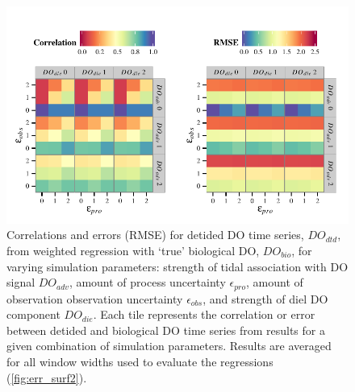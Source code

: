 \documentclass[letterpaper,12pt,oneside]{article}\usepackage[]{graphicx}\usepackage[]{color}
\makeatletter
\def\maxwidth{ %
  \ifdim\Gin@nat@width>\linewidth
    \linewidth
  \else
    \Gin@nat@width
  \fi
}
\newenvironment{knitrout}{}{} %
\makeatother
\begin{document}
\centering\vspace*{\fill}
\begin{knitrout}
\color{fgcolor}\begin{figure}[!ht]


{\centering \includegraphics[width=\maxwidth]{figure/err_surf1} 

}

\caption[Correlations and errors (\ac{RMSE}) for detided \ac{DO} time series, $DO_{dtd}$, from weighted regression with `true' biological \ac{DO}, $DO_{bio}$, for varying simulation parameters]{Correlations and errors (\ac{RMSE}) for detided \ac{DO} time series, $DO_{dtd}$, from weighted regression with `true' biological \ac{DO}, $DO_{bio}$, for varying simulation parameters: strength of tidal association with \ac{DO} signal $DO_{adv}$, amount of process uncertainty $\epsilon_{pro}$, amount of observation observation uncertainty $\epsilon_{obs}$, and strength of diel \ac{DO} component $DO_{die}$.  Each tile represents the correlation or error between detided and biological \ac{DO} time series from results for a given combination of simulation parameters.  Results are averaged for all window widths used to evaluate the regressions (\cref{fig:err_surf2}).\label{fig:err_surf1}}
\end{figure}


\end{knitrout}
\vfill
\clearpage
\end{document}
